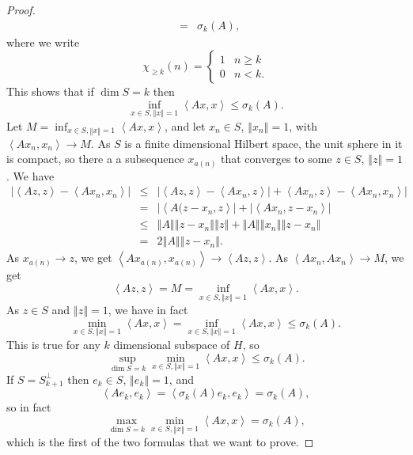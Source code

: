 \documentclass{article}
\newcommand{\inner}[2]{\left\langle #1, #2 \right\rangle}
\newcommand{\norm}[1]{\left\Vert #1 \right\Vert}
\theoremstyle{definition}
\begin{document}
\begin{proof}
\begin{eqnarray*}
&=&\sigma_k(A),
\end{eqnarray*}
where we write
\[
\chi_{\geq k}(n)=\begin{cases}
1&n \geq k\\
0&n<k.
\end{cases}
\]
This shows that if $\dim S=k$ then
\[
\inf_{x \in S, \norm{x}=1} \inner{Ax}{x} \leq \sigma_k(A).
\] 
Let $M = \inf_{x \in S, \norm{x}=1} \inner{Ax}{x}$, and
let $x_n \in S$, $\norm{x_n}=1$, with $\inner{Ax_n}{x_n} \to M$.
As $S$ is a finite dimensional Hilbert space, the unit sphere in it is compact, so there a 
a subsequence $x_{a(n)}$ that converges to some $z \in S$, $\norm{z}=1$. 
We have
\begin{eqnarray*}
|\inner{Az}{z}-\inner{Ax_n}{x_n}|&\leq&|\inner{Az}{z}-\inner{Ax_n}{z}|+\inner{Ax_n}{z}-\inner{Ax_n}{x_n}|\\
&=&|\inner{A(z-x_n}{z}| + |\inner{Ax_n}{z-x_n}|\\
&\leq&\norm{A}\norm{z-x_n} \norm{z} + \norm{A}\norm{x_n}\norm{z-x_n}\\
&=&2\norm{A} \norm{z-x_n}.
\end{eqnarray*}
As $x_{a(n)} \to z$, we get $\inner{Ax_{a(n)}}{x_{a(n)}} \to \inner{Az}{z}$. As $\inner{Ax_n}{Ax_n} \to M$, we get
\[
\inner{Az}{z}=M=\inf_{x \in S, \norm{x}=1} \inner{Ax}{x}.
\]
As $z \in S$ and $\norm{z}=1$, we have in fact
\[
\min_{x \in S, \norm{x}=1}  \inner{Ax}{x}=\inf_{x \in S, \norm{x}=1} \inner{Ax}{x} \leq \sigma_k(A).
\]
This is true for any $k$ dimensional subspace of $H$, so
\[
\sup_{\dim S = k} \min_{x \in S, \norm{x}=1} \inner{Ax}{x} \leq \sigma_k(A).
\]
If $S=S_{k+1}^\perp$ then $e_k \in S$, $\norm{e_k}=1$,  and
\[
\inner{Ae_k}{e_k} = \inner{\sigma_k(A) e_k}{e_k} = \sigma_k(A),
\]
so in fact
\[
\max_{\dim S = k} \min_{x \in S, \norm{x}=1} \inner{Ax}{x} = \sigma_k(A),
\]
which is the first of the two formulas that we want to prove.


\end{proof}
\end{document}
